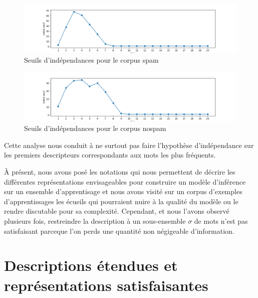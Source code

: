 \documentclass[a4paper, french]{article}
\begin{document}
\begin{figure}[h]
\begin{center}
    \caption{Seuils d'ind\'ependances pour le corpus spam}
    \label{fig:seuils_indes_spam}
    \includegraphics[width=15cm]{seuils_indes_nospam}
\end{center}
\end{figure}

\begin{figure}[h]
\begin{center}
    \caption{Seuils d'ind\'ependances pour le corpus nospam}
    \label{fig:seuils_indes_nospam}
    \includegraphics[width=15cm]{seuils_indes_spam}
\end{center}
\end{figure}

Cette analyse nous conduit \`a ne surtout pas faire l'hypoth\`ese 
d'ind\'ependance sur les premiers descripteurs correspondants aux mots
les plus fr\'equents.

\`A pr\'esent, nous avons pos\'e les notations qui nous permettent 
de d\'ecrire les diff\'erentes repr\'esentations envisageables pour
construire un mod\`ele d'inf\'erence sur un ensemble d'apprentisage 
et nous avons visit\'e sur un corpus d'exemples d'apprentissages les
\'ecueils qui pourraient nuire \`a la qualit\'e du mod\`ele ou le rendre
discutable pour sa complexit\'e. Cependant, et nous l'avons observ\'e
plusieurs fois, restreindre la description \`a un sous-ensemble $\sigma$
de mots n'est pas satisfaisant parceque l'on perds une quantit\'e non
n\'egigeable d'information.

\section{Descriptions \'etendues et repr\'esentations satisfaisantes}

\end{document}
